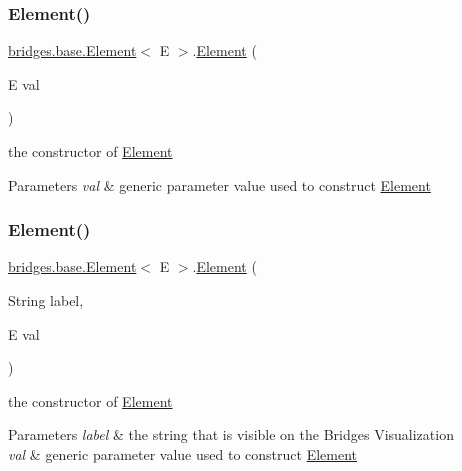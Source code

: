 \subsubsection{\texorpdfstring{Element()}{Element()}\hspace{0.1cm}{\footnotesize\ttfamily [2/4]}}
{\footnotesize\ttfamily \hyperlink{classbridges_1_1base_1_1_element}{bridges.\+base.\+Element}$<$ E $>$.\hyperlink{classbridges_1_1base_1_1_element}{Element} (\begin{DoxyParamCaption}\item[{E}]{val }\end{DoxyParamCaption})}

the constructor of \hyperlink{classbridges_1_1base_1_1_element}{Element}


\begin{DoxyParams}{Parameters}
{\em val} & generic parameter value used to construct \hyperlink{classbridges_1_1base_1_1_element}{Element} \\
\hline
\end{DoxyParams}
\hypertarget{classbridges_1_1base_1_1_element_a14e857e8050eac518900a458f0364d8e}{}\label{classbridges_1_1base_1_1_element_a14e857e8050eac518900a458f0364d8e} 
\subsubsection{\texorpdfstring{Element()}{Element()}\hspace{0.1cm}{\footnotesize\ttfamily [3/4]}}
{\footnotesize\ttfamily \hyperlink{classbridges_1_1base_1_1_element}{bridges.\+base.\+Element}$<$ E $>$.\hyperlink{classbridges_1_1base_1_1_element}{Element} (\begin{DoxyParamCaption}\item[{String}]{label,  }\item[{E}]{val }\end{DoxyParamCaption})}

the constructor of \hyperlink{classbridges_1_1base_1_1_element}{Element} 
\begin{DoxyParams}{Parameters}
{\em label} & the string that is visible on the Bridges Visualization \\
\hline
{\em val} & generic parameter value used to construct \hyperlink{classbridges_1_1base_1_1_element}{Element} \\
\hline
\end{DoxyParams}
\hypertarget{classbridges_1_1base_1_1_element_a91db9de70b65a1d7b5f27c1c0b909832}{}\label{classbridges_1_1base_1_1_element_a91db9de70b65a1d7b5f27c1c0b909832} 
